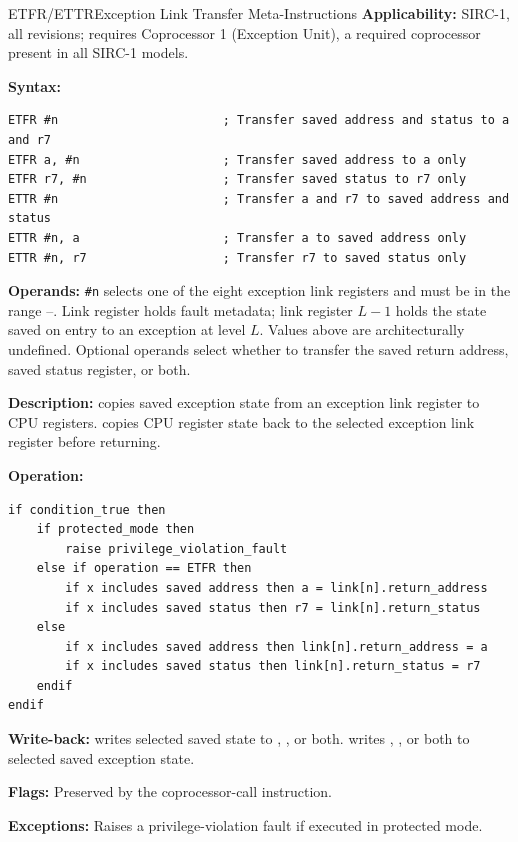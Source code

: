 \begin{instructionbox}{ETFR/ETTR}{Exception Link Transfer Meta-Instructions}
	\textbf{Applicability:} SIRC-1, all revisions; requires Coprocessor 1 (Exception Unit), a required coprocessor
	present in all SIRC-1 models.

	\textbf{Syntax:}
	\begin{lstlisting}
ETFR #n                       ; Transfer saved address and status to a and r7
ETFR a, #n                    ; Transfer saved address to a only
ETFR r7, #n                   ; Transfer saved status to r7 only
ETTR #n                       ; Transfer a and r7 to saved address and status
ETTR #n, a                    ; Transfer a to saved address only
ETTR #n, r7                   ; Transfer r7 to saved status only
\end{lstlisting}

	\textbf{Operands:} \texttt{\#n} selects one of the eight exception link registers and must be in the range
	--. Link register  holds fault metadata; link register $L-1$ holds the state saved on entry to
	an exception at level $L$. Values above  are architecturally undefined. Optional operands select whether to transfer the saved
	return address, saved status register, or both.

	\textbf{Description:}  copies saved exception state from an exception link register to CPU registers.
	 copies CPU register state back to the selected exception link register before returning.

	\textbf{Operation:}
	\begin{verbatim}
if condition_true then
    if protected_mode then
        raise privilege_violation_fault
    else if operation == ETFR then
        if x includes saved address then a = link[n].return_address
        if x includes saved status then r7 = link[n].return_status
    else
        if x includes saved address then link[n].return_address = a
        if x includes saved status then link[n].return_status = r7
    endif
endif
\end{verbatim}

	\textbf{Write-back:}  writes selected saved state to , , or both.  writes
	, , or both to selected saved exception state.

	\textbf{Flags:} Preserved by the coprocessor-call instruction.

	\textbf{Exceptions:} Raises a privilege-violation fault if executed in protected mode.


\end{instructionbox}
